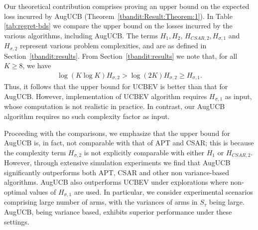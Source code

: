 Our theoretical contribution comprises 
 proving an upper bound on the expected loss incurred by AugUCB (Theorem~\ref{tbandit:Result:Theorem:1}).
In Table \ref{tab:regret-bds} we compare the upper bound on the losses incurred by the various algorithms, including AugUCB. The terms $H_1, H_2$, $H_{CSAR,2}, H_{\sigma,1}$ and $H_{\sigma,2}$ represent various problem complexities, and are as defined in Section~\ref{tbandit:results}. From Section~\ref{tbandit:results} we note that, for all $K\ge8$, we have
\begin{align*}
\log\left(K\log K\right) H_{\sigma,2} > \log(2K) H_{\sigma,2} \ge H_{\sigma,1}.
\end{align*}
Thus, it follows that the upper bound for UCBEV is better than that for AugUCB.
 However, implementation of UCBEV algorithm requires $H_{\sigma,1}$ as input, whose computation is not realistic in practice. In contrast, our AugUCB algorithm requires no such complexity factor as input. 

Proceeding with the comparisons, we emphasize that the upper bound for  AugUCB is, in fact, not comparable with that of APT and CSAR; this is because the complexity term $H_{\sigma,2}$ is not explicitly comparable with either $H_1$ or $H_{CSAR,2}$. However, through extensive simulation experiments we find that AugUCB significantly outperforms both APT, CSAR and other non variance-based algorithms. AugUCB also outperforms UCBEV under explorations where non-optimal values of $H_{\sigma,1}$  are used. In particular, we consider experimental scenarios comprising large number of arms, with the variances of arms in $S_\tau$ being large. AugUCB, being variance based, exhibits superior performance under these settings.  
%


